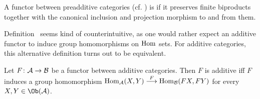 \documentclass[a4paper,parskip=half,numbers=enddot, DIV=12]{scrreprt}
\begin{document}
\begin{defi}
	A functor between preadditive categories (cf. \cite[Definition~A.1.1]{alggeo2}) is  if it preserves finite biproducts together with the canonical inclusion and projection morphism to and from them.
\end{defi}
\begin{rem*}
	Definition~ seems kind of counterintuitive, as one would rather expect an additive functor to induce group homomorphisms on $\operatorname{Hom}$ sets. For additive categories, this alternative definition turns out to be equivalent.
\end{rem*}
\begin{prop}
	Let $F\colon \Aa\morphism\Bb$ be a functor between additive categories. Then $F$ is additive iff $F$ induces a group homomorphism $\Hom_\Aa(X,Y)\morphism[F]\Hom_\Bb(FX,FY)$ for every $X,Y\in\Ob(\Aa)$.
\end{prop}
\end{document}
